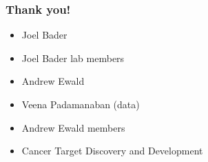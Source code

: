 \documentclass{beamer} %
\begin{document}
\begin{frame}
 	\frametitle{Thank you!}
	\begin{itemize}
			\item Joel Bader
			\item Joel Bader lab members
			\newline
			\item Andrew Ewald
			\item Veena Padamanaban (data)
			\item Andrew Ewald members
			\newline
			\item Cancer Target Discovery and Development 
	\end{itemize}
\end{frame}


%
%
%
%
%

% 
% 
\end{document}

